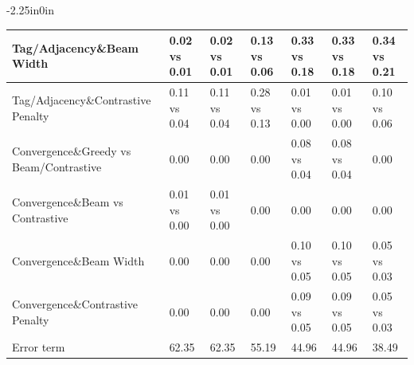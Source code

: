 \begin{table}[h]
\begin{adjustwidth}{-2.25in}{0in}
{\begin{tabular}{|l|lll|lll|}
\hline
Tag/Adjacency\&Beam Width & 0.02 vs 0.01 & 0.02 vs 0.01 & 0.13 vs 0.06 & 0.33 vs 0.18 & 0.33 vs 0.18 & 0.34 vs 0.21 \\
\hline
Tag/Adjacency\&Contrastive Penalty & 0.11 vs 0.04 & 0.11 vs 0.04 & 0.28 vs 0.13 & 0.01 vs 0.00 & 0.01 vs 0.00 & 0.10 vs 0.06 \\
\hline
Convergence\&Greedy vs Beam/Contrastive & 0.00 & 0.00 & 0.00 & 0.08 vs 0.04 & 0.08 vs 0.04 & 0.00 \\
\hline
Convergence\&Beam vs Contrastive & 0.01 vs 0.00 & 0.01 vs 0.00 & 0.00 & 0.00 & 0.00 & 0.00 \\
\hline
Convergence\&Beam Width & 0.00 & 0.00 & 0.00 & 0.10 vs 0.05 & 0.10 vs 0.05 & 0.05 vs 0.03 \\
\hline
Convergence\&Contrastive Penalty & 0.00 & 0.00 & 0.00 & 0.09 vs 0.05 & 0.09 vs 0.05 & 0.05 vs 0.03 \\
\hline
\cellcolor[HTML]{FDE9D9}Error term & 62.35 & 62.35 & 55.19 & 44.96 & 44.96 & 38.49 \\
\hline
\end{tabular}
}
\label{table:algo2_variance_decomposition}
\end{adjustwidth}
\end{table}

